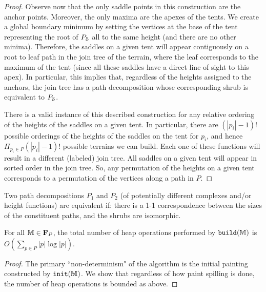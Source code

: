 {\begin{proof}
 Observe now that the only saddle points in this construction are the anchor points.  Moreover, the only maxima are the apexes of the 
 tents.  We create a global boundary minimum by setting the vertices at the base of the tent representing the root of $P_{\mathcal{S}}$ all to the same height (and there are no other minima).  
 Therefore, the saddles on a given tent will appear contiguously on a root to leaf path in the join tree of the terrain, where the leaf corresponds to the maximum of the tent 
 (since all these saddles have a direct line of sight to this apex).  In particular, 
 this implies that, regardless of the heights assigned to the anchors, the join tree has a path decomposition whose corresponding shrub is equivalent to $P_{\mathcal{S}}$.  
 
 There is a valid instance of this described construction for any relative ordering of the heights of the saddles on a given tent.  
 In particular, there are $(|p_i|-1)!$ possible orderings of the heights of the saddles on the tent for $p_i$, and hence $\Pi_{p_i\in P} (|p_i|-1)!$ possible 
 terrains we can build.  Each one of these functions will result in a different (labeled) join tree. All saddles on a given tent will appear in sorted order in the join tree.
 So, any permutation of the heights on a given tent corresponds to a permutation of the vertices along a path in $P$.
\end{proof}

Two path decompositions $P_1$ and $P_2$ (of potentially different complexes and/or height functions) are equivalent 
if: there is a 1-1 correspondence between the sizes of the constituent paths, and the shrubs are isomorphic.
%
%

\begin{lemma}
\label{lem:cost}
For all $\mathbb{M} \in {\bf F}_P$, the total number of heap operations performed by ${\tt build}(\mathbb{M})$ is $O(\sum_{p\in P} |p|\log|p|)$.
\end{lemma}
\begin{proof}
The primary ``non-determinism" of the algorithm is the initial painting constructed by ${\tt init}(\mathbb{M})$. 
We show that regardless of how paint spilling is done, the number of heap operations is bounded as above.


\end{proof}}
